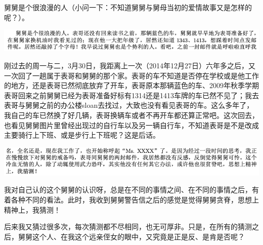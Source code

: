 \documentclass[9pt, b5paper]{article}
\begin{document}
舅舅是个很浪漫的人（小问一下：不知道舅舅与舅母当初的爱情故事又是怎样的呢？）。 

\begin{center}
\includegraphics[width=.9\linewidth]{./pic/p1p117-1.png}
\end{center}

刚过去的周一与二，3月30日，我距离上一次（2014年12月27日）六年多之后，又一次回了一趟属于表哥和舅舅的那个家。表哥的车不知道是否停在学校或是他工作的地方，还是表哥已然彻底放弃了开车，表哥原本那辆蓝色的车、2009年秋季学期表哥回来之前舅舅已经为表哥准备好标有1314还是1413车牌的车已然不见了；我去表哥与舅舅之前的办公楼sloan去找过，大致也没有看见表哥的车。这么多年了，我自己的车已然换了好几辆，表哥换辆车或者不再开车都还算正常吧。这次回去，也看见舅舅图片里曾经出现过的自行车以及另一辆自行车，不知道表哥是不是改成主要骑行上下班、或是步行上下班呢？这是后话。 

\begin{center}
\includegraphics[width=.9\linewidth]{./pic/p1p117-3.png}
\end{center}

我对自己认的这个舅舅的认识呀，总是在不同的事情之间、在不同的事情之后，有着各种不同的看法。此时，我收到舅舅警告信之后的感觉是觉得舅舅贪脊，思想上精神上，我猜测！

后来我又猜过很多次，每次猜测都不尽相同，也无可厚非。只是，在所有的猜测之后，舅舅这个人、在我这个远亲侄女的眼中，又究竟是正是反、是肯是否呢？
\end{document}
